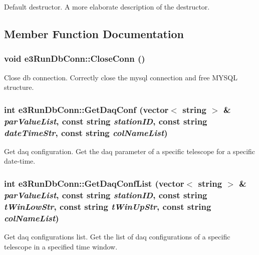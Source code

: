 Default destructor. A more elaborate description of the destructor. 

\subsection{Member Function Documentation}
\hypertarget{classe3RunDbConn_a1318d5a0927f864cb91d15a86592b595}{
\subsubsection[{CloseConn}]{\setlength{\rightskip}{0pt plus 5cm}void e3RunDbConn::CloseConn ()}}
\label{classe3RunDbConn_a1318d5a0927f864cb91d15a86592b595}


Close db connection. Correctly close the mysql connection and free MYSQL structure. \hypertarget{classe3RunDbConn_a2143f8e6b78e0a1a320be37b963a4ba6}{
\subsubsection[{GetDaqConf}]{\setlength{\rightskip}{0pt plus 5cm}int e3RunDbConn::GetDaqConf (vector$<$ string $>$ \& {\em parValueList}, \/  const string {\em stationID}, \/  const string {\em dateTimeStr}, \/  const string {\em colNameList})}}
\label{classe3RunDbConn_a2143f8e6b78e0a1a320be37b963a4ba6}


Get daq configuration. Get the daq parameter of a specific telescope for a specific date-\/time. \hypertarget{classe3RunDbConn_a7713cac73355f298e954c568217b59ba}{
\subsubsection[{GetDaqConfList}]{\setlength{\rightskip}{0pt plus 5cm}int e3RunDbConn::GetDaqConfList (vector$<$ string $>$ \& {\em parValueList}, \/  const string {\em stationID}, \/  const string {\em tWinLowStr}, \/  const string {\em tWinUpStr}, \/  const string {\em colNameList})}}
\label{classe3RunDbConn_a7713cac73355f298e954c568217b59ba}


Get daq configurations list. Get the list of daq configurations of a specific telescope in a specified time window.


